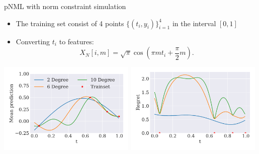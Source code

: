 \documentclass[aspectratio=169]{beamer}
\begin{document}
\begin{frame}{pNML with norm constraint simulation}
\begin{itemize}
\item The training set consist of 4 points $\{(t_i,y_i)\}_{i=1}^4$ in the interval $[0, 1]$
\item Converting $t_i$ to features:
    \begin{equation}
    X_{N}[i,m]
    =
    \sqrt{\pi} \cos \left(\pi m t_i +  \frac{\pi}{2} m\right) .
    \end{equation}
\end{itemize}

\centering
\includegraphics[width=0.49\textwidth]{figures/overparam_pnml_linear_regression_figures/figure_pnml_linear_regression_mn_prediction.pdf}
\pause
\includegraphics[width=0.49\textwidth]{figures/overparam_pnml_linear_regression_figures/figure_pnml_linear_regression_mn_regret.pdf}

\end{frame}
\end{document}
